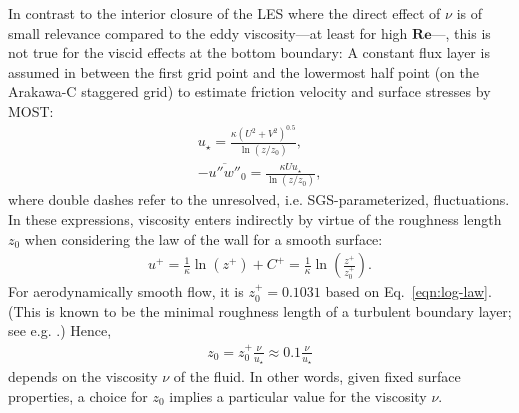\documentclass[a4paper,11pt]{article}
\newcommand{\RE}{\mathbf{Re}}
\begin{document}
In contrast to the interior closure of the LES where the direct effect of $\nu$ is of small relevance compared to the eddy viscosity---at least for high $\RE$---, this is not true for the viscid effects at the bottom boundary:  A constant flux layer is assumed in between the first grid point and the lowermost half point (on the Arakawa-C staggered grid) to estimate friction velocity and surface stresses by MOST: 
\begin{align}\label{most}
  u_\star = \frac{\kappa(U^2+V^2)^{0.5}}{\ln\left(z/z_0\right)},\\
  -\overline{u''w''}_0 = \frac{\kappa Uu_\star}{\ln\left(z/z_0\right)}, 
\end{align}
where double dashes refer to the unresolved, i.e. SGS-parameterized, fluctuations. In these expressions, viscosity enters indirectly by virtue of the roughness length $z_0$ when considering the law of the wall for a smooth surface:
\begin{align}
  u^+ = \frac{1}{\kappa}\ln(z^+) + C^+ = \frac{1}{\kappa}\ln\left(\frac{z^+}{z_0^+}\right).
\end{align}
For aerodynamically smooth flow, it is $z_0^+ = 0.1031$ based on Eq.~\ref{eqn:log-law}. (This is known to be the minimal roughness length of a turbulent boundary layer; see e.g. \citealp{kraus2008grundlagen}.) Hence,
\begin{align}
	z_0 = z_0^+\frac{\nu}{u_\star}\approx 0.1\frac{\nu}{u_\star}
\end{align}
depends on the viscosity $\nu$ of the fluid. In other words, given fixed surface properties, a choice for $z_0$ implies a particular value for the viscosity $\nu$.
\end{document}
